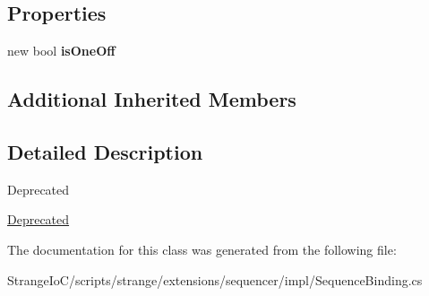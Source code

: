 \subsection*{Properties}
\begin{DoxyCompactItemize}
\item 
\hypertarget{classstrange_1_1extensions_1_1sequencer_1_1impl_1_1_sequence_binding_a93d2933bd23236e8d0dafbea9f646a96}{new bool {\bfseries is\-One\-Off}}\label{classstrange_1_1extensions_1_1sequencer_1_1impl_1_1_sequence_binding_a93d2933bd23236e8d0dafbea9f646a96}

\end{DoxyCompactItemize}
\subsection*{Additional Inherited Members}


\subsection{Detailed Description}
\begin{DoxyRefDesc}{Deprecated}
\item[\hyperlink{deprecated__deprecated000006}{Deprecated}]\end{DoxyRefDesc}


The documentation for this class was generated from the following file\-:\begin{DoxyCompactItemize}
\item 
Strange\-Io\-C/scripts/strange/extensions/sequencer/impl/Sequence\-Binding.\-cs\end{DoxyCompactItemize}
